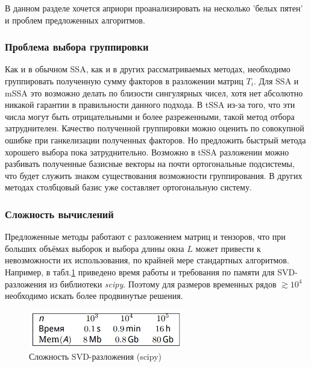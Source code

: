 			 	В данном разделе хочется априори проанализировать на несколько 'белых пятен' и проблем предложенных алгоритмов.
			 	
			 	\subsubsection*{Проблема выбора группировки}
			 	
			 		Как и в обычном SSA, как и в других рассматриваемых методах, необходимо группировать полученную сумму факторов в разложении матриц $ T_i $. Для SSA и mSSA это возможно делать по близости сингулярных чисел, хотя нет абсолютно никакой гарантии в правильности данного подхода. В tSSA из-за того, что эти числа могут быть отрицательными и более разреженными, такой метод отбора затруднителен. Качество полученной группировки можно оценить по совокупной ошибке при ганкелизации полученных факторов. Но предложить быстрый метода хорошего выбора пока затруднительно. Возможно в tSSA разложении можно разбивать полученные базисные векторы на почти ортогональные подсистемы, что будет служить знаком существования возможности группирования. В других методах столбцовый базис уже составляет ортогональную систему.
			 		
			 	\subsubsection*{Сложность вычислений}
			 	
			 		Предложенные методы работают с разложением матриц и тензоров, что при больших объёмах выборок и выбора длины окна $ L $ может привести к невозможности их использования, по крайней мере стандартных алгоритмов. Например, в табл.\ref{tab:svd_time}  приведено время работы и требования по памяти для SVD-разложения из библиотеки \textit{scipy}. Поэтому для размеров временных рядов $ \gtrsim 10^4 $ необходимо искать более продвинутые решения.
			 		
			 		\begin{figure}[h]
			 			\centering
			 			\caption{Сложность SVD-разложения (scipy)}\label{tab:svd_time}
			 			\includegraphics[width=0.6\textwidth, keepaspectratio]{../figs/svd_time.png}
			 		\end{figure}
			 		
